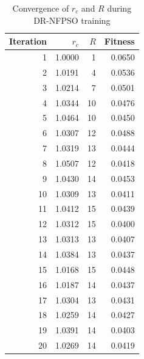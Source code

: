 
\begin{table}[H]
\centering
\caption{Convergence of \(r_c\) and \(R\) during DR-NFPSO training}
\label{tab:radius_convergence}
\begin{tabular}{rrrr}
\toprule
Iteration & \(r_c\) & \(R\) & Fitness \\
\midrule
1 & 1.0000 & 1 & 0.0650 \\
2 & 1.0191 & 4 & 0.0536 \\
3 & 1.0214 & 7 & 0.0501 \\
4 & 1.0344 & 10 & 0.0476 \\
5 & 1.0464 & 10 & 0.0450 \\
6 & 1.0307 & 12 & 0.0488 \\
7 & 1.0319 & 13 & 0.0444 \\
8 & 1.0507 & 12 & 0.0418 \\
9 & 1.0430 & 14 & 0.0453 \\
10 & 1.0309 & 13 & 0.0411 \\
11 & 1.0412 & 15 & 0.0439 \\
12 & 1.0312 & 15 & 0.0400 \\
13 & 1.0313 & 13 & 0.0407 \\
14 & 1.0384 & 13 & 0.0437 \\
15 & 1.0168 & 15 & 0.0448 \\
16 & 1.0187 & 14 & 0.0437 \\
17 & 1.0304 & 13 & 0.0431 \\
18 & 1.0259 & 14 & 0.0427 \\
19 & 1.0391 & 14 & 0.0403 \\
20 & 1.0269 & 14 & 0.0419 \\

\bottomrule
\end{tabular}
\end{table}
